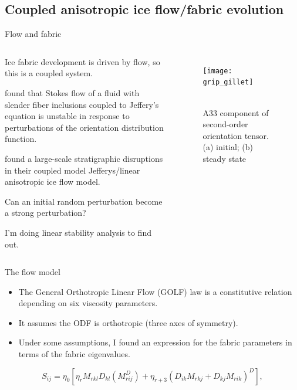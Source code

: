 \documentclass{beamer}
\begin{document}
\subsection{Coupled anisotropic ice flow/fabric evolution}
\begin{frame}{Flow and fabric}
   \begin{columns}[T]
      \begin{itemize} \small{
   \item Ice fabric development is driven by flow, so this is a coupled system.
   \item \citet{montgomery-smith2011} found that Stokes flow of a fluid with slender fiber inclusions coupled to Jeffery's equation is unstable in response to perturbations of the orientation distribution function.
   \item \citet{gillet2006} found a large-scale stratigraphic disruptions in their coupled model Jefferys/linear anisotropic ice flow model.
   \item Can an initial random perturbation become a strong perturbation?
   \item I'm doing linear stability analysis to find out.
   }
\end{itemize} 
\begin{figure}
   \texttt{[image: grip\_gillet]}
   \caption{\tiny{\\ A33 component of second-order orientation tensor. (a) initial; (b) steady state \citet{gillet2006}}}

\end{figure}
\end{columns}
\end{frame}


\begin{frame}{The flow model}
   \begin{itemize}
      \item The General Orthotropic Linear Flow (GOLF) law \citep{gillet2005} is a constitutive relation depending on six viscosity parameters.
      \item It assumes the ODF is orthotropic (three axes of symmetry).
      \item Under some assumptions, I found an expression for the fabric parameters in terms of the fabric eigenvalues.
   \end{itemize}
   \begin{equation}
   S_{ij} = \eta_0 \left[ \eta_r M_{rkl} D_{kl} \left( M_{rij}^D \right)  + \eta_{r+3} \left( D_{ik} M_{rkj} + D_{kj} M_{rik} \right)^D \right],
   \end{equation}
\end{frame}
\end{document}
